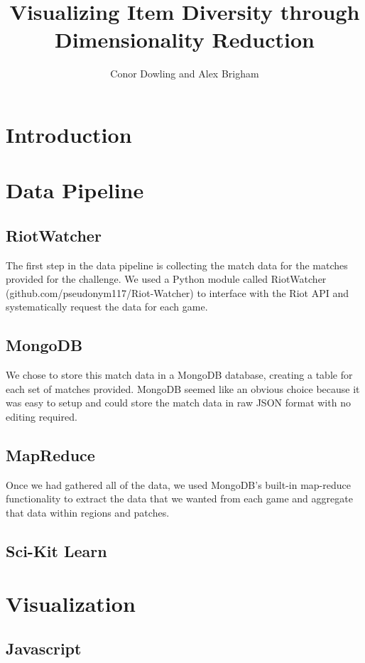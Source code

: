 \documentclass[11pt]{amsart}
\title{Visualizing Item Diversity through Dimensionality Reduction}
\author{Conor Dowling and Alex Brigham}
\begin{document}
\maketitle


\section{Introduction}

\section{Data Pipeline}
\subsection{RiotWatcher}
The first step in the data pipeline is collecting the match data for the matches provided for the challenge. We used a Python module called RiotWatcher (github.com/pseudonym117/Riot-Watcher) to interface with the Riot API and systematically request the data for each game.

\subsection{MongoDB}
We chose to store this match data in a MongoDB database, creating a table for each set of matches provided. MongoDB seemed like an obvious choice because it was easy to setup and could store the match data in raw JSON format with no editing required.

\subsection{MapReduce}
Once we had gathered all of the data, we used MongoDB's built-in map-reduce functionality to extract the data that we wanted from each game and aggregate that data within regions and patches.

\subsection{Sci-Kit Learn}

\section{Visualization}
\subsection{Javascript}
\end{document}
